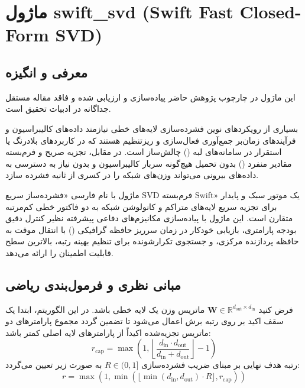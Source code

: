 \section{ماژول swift\_svd (Swift Fast Closed-Form SVD)}
\label{sec:module_swift_svd}

\subsection{معرفی و انگیزه}
این ماژول در چارچوب پژوهش حاضر پیاده‌سازی و ارزیابی شده و فاقد مقاله مستقل جداگانه در ادبیات تحقیق است.

بسیاری از رویکردهای نوین فشرده‌سازی لایه‌های خطی نیازمند داده‌های کالیبراسیون و فرآیندهای زمان‌بر جمع‌آوری فعال‌سازی و ریزتنظیم هستند که در کاربردهای بلادرنگ یا استقرار در سامانه‌های لبه () چالش‌ساز است. در مقابل، تجزیه صریح و فرم‌بسته مقادیر منفرد () بدون تحمیل هیچ‌گونه سربار کالیبراسیون و بدون نیاز به دسترسی به داده‌های بیرونی می‌تواند وزن‌های شبکه را در کسری از ثانیه فشرده سازد.

ماژول  با نام فارسی «فشرده‌ساز سریع SVD فرم‌بسته Swift» یک موتور سبک و پایدار برای تجزیه سریع لایه‌های متراکم و کانولوشن شبکه به دو فاکتور خطی کم‌مرتبه متقارن است. این ماژول با پیاده‌سازی مکانیزم‌های دفاعی پیشرفته نظیر کنترل دقیق بودجه پارامتری، بازیابی خودکار در زمان سرریز حافظه گرافیکی () با انتقال موقت به حافظه پردازنده مرکزی، و جستجوی تکرارشونده برای تنظیم بهینه رتبه، بالاترین سطح قابلیت اطمینان را ارائه می‌دهد.

\subsection{مبانی نظری و فرمول‌بندی ریاضی}
فرض کنید $\mathbf{W} \in \mathbb{R}^{d_{\text{out}} \times d_{\text{in}}}$ ماتریس وزن یک لایه خطی باشد. در این الگوریتم، ابتدا یک سقف اکید بر روی رتبه برش اعمال می‌شود تا تضمین گردد مجموع پارامترهای دو ماتریس تجزیه‌شده اکیداً از پارامترهای لایه اصلی کمتر باشد:
\begin{equation}
r_{\text{cap}} = \max \left( 1, \left\lfloor \frac{d_{\text{in}} \cdot d_{\text{out}}}{d_{\text{in}} + d_{\text{out}}} \right\rfloor - 1 \right)
\end{equation}
رتبه هدف نهایی بر مبنای ضریب فشرده‌سازی $R \in (0, 1]$ به صورت زیر تعیین می‌گردد:
\begin{equation}
r = \max \left( 1, \min \left( \lfloor \min(d_{\text{in}}, d_{\text{out}}) \cdot R \rfloor, r_{\text{cap}} \right) \right)
\end{equation}

